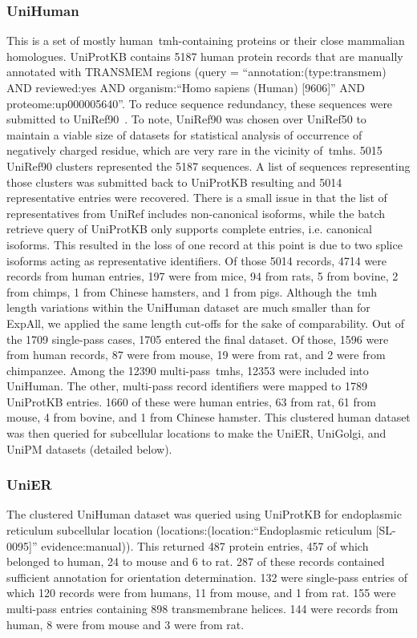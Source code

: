 \subsubsection{UniHuman}
This is a set of mostly human~\gls{tmh}-containing proteins or their close mammalian homologues.
UniProtKB contains 5187 human protein records that are manually annotated with TRANSMEM regions (query = ``annotation:(type:transmem) AND reviewed:yes AND organism:``Homo sapiens (Human) [9606]'' AND proteome:up000005640''.
To reduce sequence redundancy, these sequences were submitted to UniRef90~\cite{Suzek2015}.
To note, UniRef90 was chosen over UniRef50 to maintain a viable size of datasets for statistical analysis of occurrence of negatively charged residue, which are very rare in the vicinity of~\gls{tmh}s.
5015 UniRef90 clusters represented the 5187 sequences.
A list of sequences representing those clusters was submitted back to UniProtKB resulting and 5014 representative entries were recovered.
There is a small issue in that the list of representatives from UniRef includes non-canonical isoforms, while the batch retrieve query of UniProtKB only supports complete entries, i.e.
canonical isoforms.
This resulted in the loss of one record at this point is due to two splice isoforms acting as representative identifiers.
Of those 5014 records, 4714 were records from human entries, 197 were from mice, 94 from rats, 5 from bovine, 2 from chimps, 1 from Chinese hamsters, and 1 from pigs.
Although the~\gls{tmh} length variations within the UniHuman dataset are much smaller than for ExpAll, we applied the same length cut-offs for the sake of comparability.
Out of the 1709 single-pass cases, 1705 entered the final dataset.
Of those, 1596 were from human records, 87 were from mouse, 19 were from rat, and 2 were from chimpanzee.
Among the 12390 multi-pass~\gls{tmh}s, 12353 were included into UniHuman.
The other, multi-pass record identifiers were mapped to 1789 UniProtKB entries.
1660 of these were human entries, 63 from rat, 61 from mouse, 4 from bovine, and 1 from Chinese hamster.
This clustered human dataset was then queried for subcellular locations to make the UniER, UniGolgi, and UniPM datasets (detailed below).

\subsubsection{UniER}
The clustered UniHuman dataset was queried using UniProtKB for endoplasmic reticulum subcellular location (locations:(location:``Endoplasmic reticulum [SL-0095]'' evidence:manual)).
This returned 487 protein entries, 457 of which belonged to human, 24 to mouse and 6 to rat.
287 of these records contained sufficient annotation for orientation determination.
132 were single-pass entries of which 120 records were from humans, 11 from mouse, and 1 from rat.
155 were multi-pass entries containing 898 transmembrane helices.
144 were records from human, 8 were from mouse and 3 were from rat.


